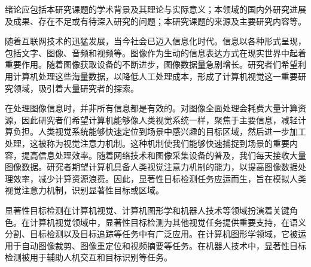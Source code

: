 



%
%
%
%
%
%
%
%
%
%
%


绪论应包括本研究课题的学术背景及其理论与实际意义；本领域的国内外研究进展及成果、存在不足或有待深入研究的问题；本研究课题的来源及主要研究内容等。
\label{chap:part1}

随着互联网技术的迅猛发展，当今社会已迈入信息化时代。信息以各种形式呈现，包括文字、图像、音频和视频等。图像作为生动的信息表达方式在现实世界中起着重要作用。随着图像获取设备的不断进步，图像数据量急剧增长。研究者们希望利用计算机处理这些海量数据，以降低人工处理成本，形成了计算机视觉这一重要研究领域，吸引着大量研究者的探索。

在处理图像信息时，并非所有信息都是有效的。对图像全面处理会耗费大量计算资源，因此研究者们希望计算机能够像人类视觉系统一样，聚焦于主要信息，减轻计算负担。人类视觉系统能够快速定位到场景中感兴趣的目标区域，然后进一步加工处理，这被称为视觉注意力机制。这种机制使我们能够快速捕捉到场景的重要内容，提高信息处理效率。随着网络技术和图像采集设备的普及，我们每天接收大量图像数据。研究者期望计算机具备人类视觉注意力机制的能力，以提高图像数据处理效率，减少计算资源浪费。因此，显著性目标检测任务应运而生，旨在模拟人类视觉注意力机制，识别显著性目标或区域。


显著性目标检测在计算机视觉、计算机图形学和机器人技术等领域扮演着关键角色。在计算机视觉领域中，显著性目标检测为其他视觉任务提供重要支持，在语义分割、目标检测以及目标追踪等任务中有广泛应用。在计算机图形学领域，它被运用于自动图像裁剪、图像重定位和视频摘要等任务。在机器人技术中，显著性目标检测被用于辅助人机交互和目标识别等任务。

